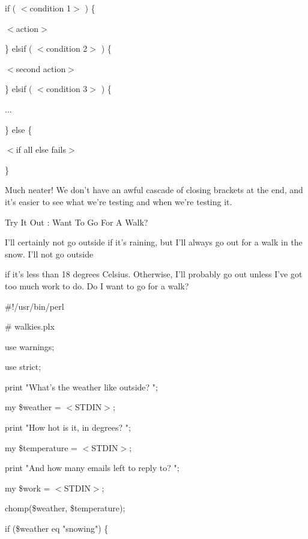 \documentclass[a4paper,11pt]{book}
\begin{document}
\noindent 

\noindent if ( $<$condition 1$>$ ) \{

\noindent $<$action$>$

\noindent \} elsif ( $<$condition 2$>$ ) \{

\noindent $<$second action$>$

\noindent \} elsif ( $<$condition 3$>$ ) \{

\noindent ...

\noindent \} else \{

\noindent $<$if all else fails$>$

\noindent \}

\noindent 

\noindent Much neater! We don't have an awful cascade of closing brackets at the end, and it's easier to see what we're testing and when we're testing it.

\noindent 

\noindent 

\noindent Try It Out : Want To Go For A Walk?

\noindent 

\noindent I'll certainly not go outside if it's raining, but I'll always go out for a walk in the snow. I'll not go outside

\noindent if it's less than 18 degrees Celsius. Otherwise, I'll probably go out unless I've got too much work to do. Do I want to go for a walk?

\noindent 

\noindent \#!/usr/bin/perl

\noindent \# walkies.plx

\noindent use warnings;

\noindent use strict;

\noindent 

\noindent print "What's the weather like outside? ";

\noindent my \$weather = $<$STDIN$>$;

\noindent print "How hot is it, in degrees? ";

\noindent my \$temperature = $<$STDIN$>$;

\noindent print "And how many emails left to reply to? ";

\noindent my \$work = $<$STDIN$>$;

\noindent chomp(\$weather, \$temperature);

\noindent 

\noindent if (\$weather eq "snowing") \{
\end{document}

